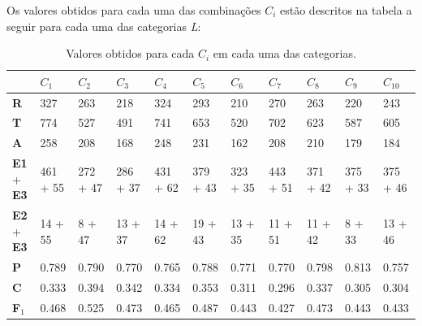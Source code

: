 \documentclass[11pt]{report}
\begin{document}
Os valores obtidos para cada uma das combinações $C_i$ estão descritos na tabela a seguir para cada uma das categorias \textit{L}:

\begin{table}[h!]
  \centering
  \hspace*{-2.1cm}
  \def\arraystretch{1.1}
  \begin{tabular}{| P{1.45cm} | P{1.36cm} | P{1.36cm} | P{1.36cm} | P{1.36cm} | P{1.36cm} | P{1.36cm} | P{1.36cm} | P{1.36cm} | P{1.36cm} | P{1.36cm} |}
    \hline
     & $C_1$ & $C_2$ & $C_3$ & $C_4$ & $C_5$ & $C_6$ & $C_7$ & $C_8$ & $C_9$ & $C_{10}$ \\
    \hline
    \small{\textbf{R}}                 & \small{327} & \small{263} & \small{218} & \small{324} & \small{293} & \small{210} & \small{270} & \small{263} & \small{220} & \small{243} \\ \hline
    \small{\textbf{T}}                 & \small{774} & \small{527} & \small{491} & \small{741} & \small{653} & \small{520} & \small{702} & \small{623} & \small{587} & \small{605} \\ \hline
    \small{\textbf{A}}   & \small{258} & \small{208} & \small{168} & \small{248} & \small{231} & \small{162} & \small{208} & \small{210} & \small{179} & \small{184} \\ \hline
    \small{\textbf{E1} + \textbf{E3}} & \small{461 + 55} & \small{272 + 47} & \small{286 + 37} & \small{431 + 62} & \small{379 + 43} & \small{323 + 35} & \small{443 + 51} & \small{371 + 42} & \small{375 + 33} & \small{375 + 46} \\ \hline
    \small{\textbf{E2} + \textbf{E3}} & \small{14 + 55} & \small{8 + 47} & \small{13 + 37} & \small{14 + 62} & \small{19 + 43} & \small{13 + 35} & \small{11 + 51} & \small{11 + 42} & \small{8 + 33} & \small{13 + 46} \\ \hline\hline
    \small{\textbf{P}} & \small{0.789} & \small{0.790} & \small{0.770} & \small{0.765} & \small{0.788} & \small{0.771} & \small{0.770} & \small{0.798} & \small{0.813} & \small{0.757} \\ \hline
    \small{\textbf{C}} & \small{0.333} & \small{0.394} & \small{0.342} & \small{0.334} & \small{0.353} & \small{0.311} & \small{0.296} & \small{0.337} & \small{0.305} & \small{0.304} \\ \hline
\small{\textbf{F$_1$}} & \small{0.468} & \small{0.525} & \small{0.473} & \small{0.465} & \small{0.487} & \small{0.443} & \small{0.427} & \small{0.473} & \small{0.443} & \small{0.433} \\ \hline
    \end{tabular}
  \caption{Valores obtidos para cada $C_i$ em cada uma das categorias.}
\end{table}
\end{document}
